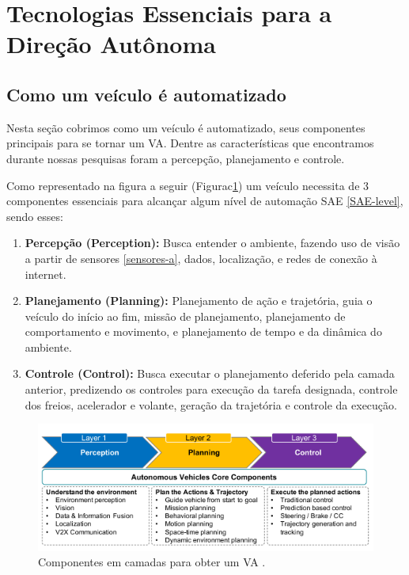 \section{Tecnologias Essenciais para a Direção Autônoma}

\subsection{Como um veículo é automatizado}
Nesta seção cobrimos como um veículo é automatizado, seus componentes principais para se tornar um VA. Dentre as características que encontramos durante nossas pesquisas foram a percepção, planejamento e controle.

Como representado na figura a seguir (Figurac\ref{figura_perception}) um veículo necessita de 3 componentes essenciais para alcançar algum nível de automação SAE \ref{SAE-level}, sendo esses:


\begin{enumerate}
 \item \textbf{Percepção (Perception):} Busca entender o ambiente, fazendo uso de visão a partir de sensores \ref{sensores-a}, dados, localização, e redes de conexão à internet.
\item \textbf{Planejamento (Planning):} Planejamento de ação e trajetória, guia o veículo do início ao fim, missão de planejamento, planejamento de comportamento e movimento, e planejamento de tempo e da dinâmica do ambiente.
\item \textbf{Controle (Control):} Busca executar o planejamento deferido pela camada anterior, predizendo os controles para execução da tarefa designada, controle dos freios, acelerador e volante, geração da trajetória e controle da execução.

\end{enumerate}

\begin{figure}[H]
\centering
\includegraphics[width=\textwidth]{Figures/perception.png}
\caption{Componentes em camadas para obter um VA \cite{sensors-yet}.}
\label{figura_perception}
\end{figure}

